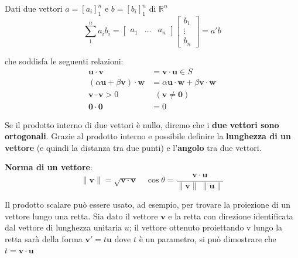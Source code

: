 \documentclass[a4paper, 10pt]{article}
\renewcommand{\vec}{\bm}
\newcommand{\numberset}{\mathbb}
\newcommand{\R}{\numberset{R}}
\begin{document}
			Dati due vettori $ a = [a_i]_1^n $ e $ b = [b_i]_1^n $ di $ \R^n $
			\[
				\sum_{1}^{n} a_i b_i = 
				\begin{bmatrix}
					a_1 & \dots & a_n
				\end{bmatrix}
				\begin{bmatrix}
					b_1 \\
					\vdots \\
					b_n
				\end{bmatrix}
				= a'b
			\]
			
			
			che soddisfa le seguenti relazioni:
			\begin{align*}
				\vec{u} \cdot \vec{v} &= \vec{v}\cdot \vec{u} \in S \\
				(\alpha\vec{u} + \beta\vec{v}) \cdot\vec{w} &= 
				\alpha\vec{u}\cdot\vec{w} + \beta\vec{v}\cdot\vec{w} \\
				\vec{v}\cdot\vec{v} > 0 & \: \: (\vec{v} \neq \vec{0}) \\
				\vec{0}\cdot\vec{0} &= 0
			\end{align*}
			
			Se il prodotto interno di due vettori è nullo, diremo che i \textbf{due
			vettori sono ortogonali}. 
			Grazie al prodotto interno e possibile definire la \textbf{lunghezza di
			un vettore} (e quindi la distanza tra due punti) e l'\textbf{angolo} tra
			due vettori.
			
			\noindent
			\textbf{Norma di un vettore}:
			\[
				\lVert \vec{v} \rVert = \sqrt{\vec{v}\cdot\vec{v}} \quad 
				\cos \theta = \dfrac{\vec{v}\cdot\vec{u}}{\lVert \vec{v} \rVert \: \lVert \vec{u} \rVert}
			\]
			
			Il prodotto scalare può essere usato, ad esempio, per trovare la
			proiezione di un vettore lungo una retta.
			Sia dato il vettore $ \vec{v} $ e la retta con direzione identificata dal
			vettore di lunghezza unitaria $ u $; il vettore ottenuto proiettando
			v lungo la retta sarà della forma $ \vec{v}' = t\vec{u} $ dove $ t $ è un parametro,
			si può dimostrare che $ t = \vec{v} \cdot \vec{u} $
			
			\begin{center}
			\end{center}
			
\end{document}
